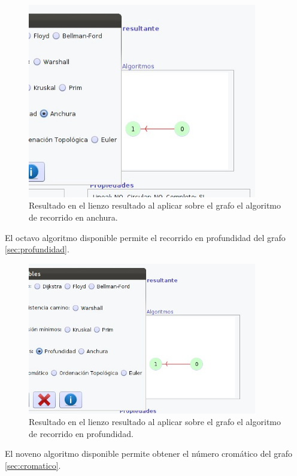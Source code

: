 \begin{figure}[H]
\begin{center}
\includegraphics[width=10cm]{./imagenes_documentacion/imagen_anchura_y_resultado.jpeg}
\caption{Resultado en el lienzo resultado al aplicar sobre el grafo el algoritmo de recorrido en anchura.}
\end{center}
\end{figure}
\newpage
El octavo algoritmo disponible permite el recorrido en profundidad del grafo \ref{sec:profundidad}.

\begin{figure}[H]
\begin{center}
\includegraphics[width=10cm]{./imagenes_documentacion/imagen_profundidad_y_resultado.jpeg}
\caption{Resultado en el lienzo resultado al aplicar sobre el grafo el algoritmo de recorrido en profundidad.}
\end{center}
\end{figure}

El noveno algoritmo disponible permite obtener el número cromático del grafo \ref{sec:cromatico}.

